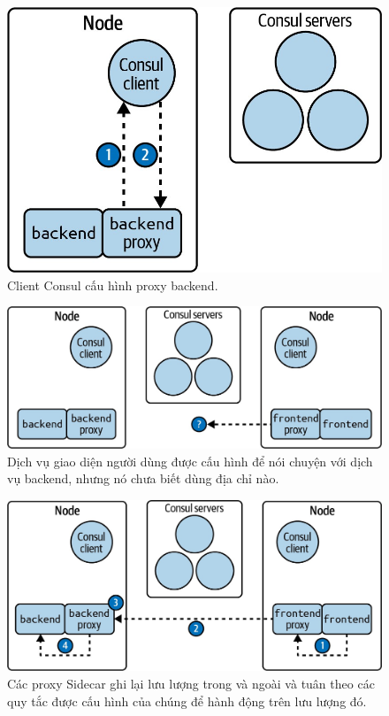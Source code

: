 \documentclass[14pt,a4paper]{report}
\begin{document}
{	\begin{figure}[h]

		\centering
		\includegraphics[width=0.7\linewidth]{Pics/example2}
		\caption{\label{fig:example2} Client Consul cấu hình proxy backend.}
		\label{fig:example2}
	\end{figure}
	
	\hspace{0.3cm}{Bây giờ hãy tưởng tượng rằng có một dịch vụ khác gọi là giao diện người dùng đang chạy trên một Node khác trong cụm và dịch vụ giao diện người dùng được cấu hình để giao tiếp với dịch vụ backend (hiển thị trong Hình 2.9).\\}
	
	\begin{figure}[h]
		\centering
		\includegraphics[width=0.7\linewidth]{Pics/example3}
		\caption{\label{fig:example3} Dịch vụ giao diện người dùng được cấu hình để nói chuyện với dịch vụ backend, nhưng nó chưa biết dùng địa chỉ nào.}
		\label{fig:example3}
	\end{figure}
	

	\begin{figure}[h]
		\centering
		\includegraphics[width=0.7\linewidth]{Pics/example5}
		\caption{\label{fig:example5} Các proxy Sidecar ghi lại lưu lượng trong và ngoài và tuân theo các quy tắc được cấu hình của chúng để hành động trên lưu lượng đó.}
		\label{fig:example5}
	\end{figure}
	
}
\end{document}
